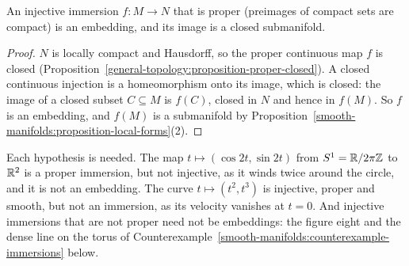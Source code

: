 \begin{proposition}\label{smooth-manifolds:proposition-proper-immersion}
An injective immersion $f \colon M \to N$ that is proper (preimages of compact sets are compact) is an embedding, and its image is a closed submanifold.
\end{proposition}

\begin{proof}
$N$ is locally compact and Hausdorff, so the proper continuous map $f$ is closed (Proposition~\ref{general-topology:proposition-proper-closed}). A closed continuous injection is a homeomorphism onto its
image, which is closed: the image of a closed subset $C \subseteq M$ is $f(C)$, closed in $N$ and hence in $f(M)$. So $f$ is an embedding, and $f(M)$ is a submanifold by
Proposition~\ref{smooth-manifolds:proposition-local-forms}(2).
\end{proof}

\begin{counterexample}\label{smooth-manifolds:counterexample-proper-immersion}
Each hypothesis is needed. The map $t \mapsto (\cos 2t, \sin 2t)$ from $S^1 = \mathbb{R}/2\pi\mathbb{Z}$ to $\mathbb{R}^2$ is a proper immersion, but not injective, as it winds twice around the circle, and it is not an
embedding. The curve $t \mapsto (t^2, t^3)$ is injective, proper and smooth, but not an immersion, as its velocity vanishes at $t = 0$. And injective immersions that are not proper need not be embeddings:
the figure eight and the dense line on the torus of Counterexample~\ref{smooth-manifolds:counterexample-immersions} below.
\end{counterexample}

